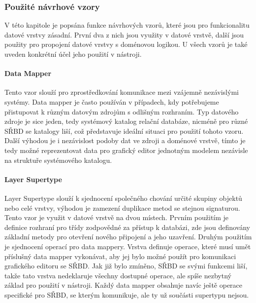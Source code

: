 \documentclass[czech,bachelor,public,dept460,male,oneside]{diploma}
\begin{document}
		\subsubsection{Použité návrhové vzory}
		V této kapitole je popsána funkce návrhových vzorů, které jsou pro funkcionalitu datové vrstvy zásadní. První dva z nich jsou využity v datové vrstvě, další jsou použity pro propojení datové vrstvy s doménovou logikou. U všech vzorů je také uveden konkrétní účel jeho použití v nástroji.
			
			\paragraph{Data Mapper}
			Tento vzor slouží pro zprostředkování komunikace mezi vzájemně nezávislými systémy. Data mapper je často používán v případech, kdy potřebujeme přistupovat k různým datovým zdrojům s odlišným rozhraním. Typ datového zdroje je sice jeden, tedy systémový katalog relační databáze, nicméně pro různé SŘBD se katalogy liší, což představuje ideální situaci pro použití tohoto vzoru. Další výhodou je i nezávislost podoby dat ve zdroji a doménové vrstvě, tímto je tedy možné reprezentovat data pro grafický editor jednotným modelem nezávisle na struktuře systémového katalogu.
			
			\paragraph{Layer Supertype} \label{secSupertype}
			Layer Supertype slouží k sjednocení společného chování určité skupiny objektů nebo celé vrstvy, výhodou je zamezení duplikace metod se stejnou signaturou. Tento vzor je využit v datové vrstvě na dvou místech. Prvním použitím je definice rozhraní pro třídy zodpovědné za přístup k databázi, zde jsou definovány základní metody pro otevření nového připojení a jeho uzavření.  Druhým použitím je sjednocení operací pro data mappery. Vrstva definuje operace, které musí umět příslušný data mapper vykonávat, aby jej bylo možné použít pro komunikaci grafického editoru se SŘBD. Jak již bylo zmíněno, SŘBD se svými funkcemi liší, takže tato vrstva nedeklaruje všechny dostupné operace, ale spíše nezbytný základ pro použití v nástroji. Každý data mapper obsahuje navíc ještě operace specifické pro SŘBD, se kterým komunikuje, ale ty už součásti supertypu nejsou.
\end{document}
